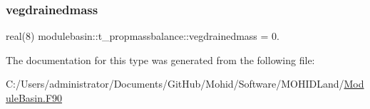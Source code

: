 \mbox{\label{structmodulebasin_1_1t__propmassbalance_aa8d066a3fd156171b71b5afc4bfea044}} 
\subsubsection{\texorpdfstring{vegdrainedmass}{vegdrainedmass}}
{\footnotesize\ttfamily real(8) modulebasin\+::t\+\_\+propmassbalance\+::vegdrainedmass = 0.\hspace{0.3cm}{\ttfamily [private]}}



The documentation for this type was generated from the following file\+:\begin{DoxyCompactItemize}
\item 
C\+:/\+Users/administrator/\+Documents/\+Git\+Hub/\+Mohid/\+Software/\+M\+O\+H\+I\+D\+Land/\mbox{\hyperlink{_module_basin_8_f90}{Module\+Basin.\+F90}}\end{DoxyCompactItemize}
